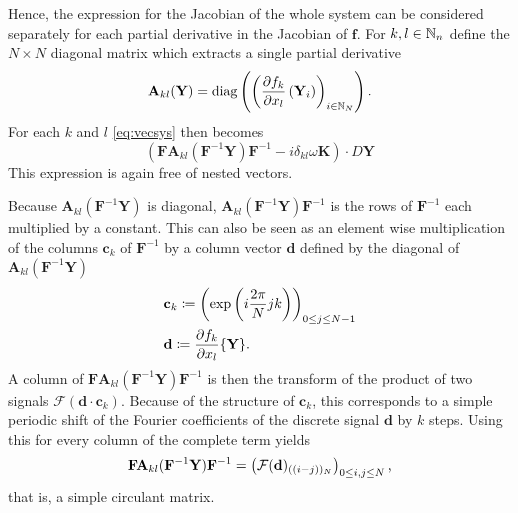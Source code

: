 Hence, the expression for the Jacobian of the whole system can be considered separately for each partial derivative in the Jacobian of $\mathbf f$.
For $k,l \in \mathbb{N}_n$ define the $N \times N$ diagonal matrix which extracts a single partial derivative
	\[
		\mathbf A_{kl}(\mathbf Y) = \operatorname{diag}\left( \left(\frac{\partial f_k}{\partial x_l} \left(\mathbf Y_i\right)\right)_{i \in \mathbb{N}_N} \right) \text.
	\]
For each $k$ and $l$ \autoref{eq:vecsys} then becomes
	\begin{equation}
		\left( \mathbf{F} \mathbf A_{kl}(\mathbf{F}^{-1} \mathbf{Y}) \mathbf{F}^{-1} - i \delta_{kl} \omega \mathbf K \right) \cdot D \mathbf Y
	\label{eq:syssingle}
	\end{equation}
This expression is again free of nested vectors.

Because $\mathbf A_{kl}(\mathbf{F}^{-1} \mathbf{Y})$ is diagonal, $\mathbf A_{kl}(\mathbf{F}^{-1} \mathbf{Y}) \mathbf{F}^{-1}$ is the rows of $\mathbf F^{-1}$ each multiplied by a constant.
This can also be seen as an element wise multiplication of the columns $\mathbf c_k$ of $\mathbf F^{-1}$ by a column vector $\mathbf d$ defined by the diagonal of $\mathbf A_{kl}(\mathbf{F}^{-1} \mathbf{Y})$
	\begin{align*}
		&\mathbf c_k \coloneqq \left(\exp\left(i\frac{2\pi}{N} j k\right)\right)_{0 \le j \le N-1}\\
		&\mathbf d \coloneqq \frac{\partial f_k}{\partial x_l} \{\mathbf Y\} \text.
	\end{align*}
A column of $\mathbf{F} \mathbf A_{kl}(\mathbf{F}^{-1} \mathbf{Y}) \mathbf{F}^{-1}$ is then the transform of the product of two signals $\mathcal F(\mathbf d \cdot \mathbf c_k)$.
Because of the structure of $\mathbf c_k$, this corresponds to a simple periodic shift of the Fourier coefficients of the discrete signal $\mathbf d$ by $k$ steps.
Using this for every column of the complete term yields
	\[
			\mathbf{F} \mathbf A_{kl}(\mathbf{F}^{-1} \mathbf{Y}) \mathbf{F}^{-1} = \left( \mathbf {\mathcal{F}}(\mathbf d)_{((i-j))_N} \right)_{0 \le i,j \le N} \text,
	\]
that is, a simple circulant matrix.

